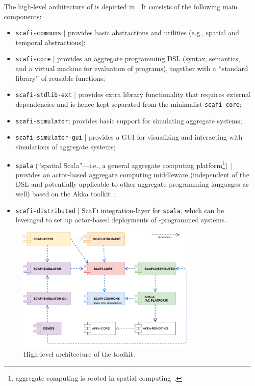 The high-level architecture of \scafi{} is depicted in .
It consists of the following main components: %
\begin{itemize}
\item \texttt{scafi-commons} | provides basic abstractions and utilities (e.g., spatial and temporal abstractions);
\item \texttt{scafi-core} | provides an aggregate programming DSL (syntax, semantics, and a virtual machine for evaluation of programs), together with a ``standard library'' of reusable functions;
\item \texttt{scafi-stdlib-ext} | provides extra library functionality that requires external dependencies and is hence kept separated from the minimalist \texttt{scafi-core};
\item \texttt{scafi-simulator}: provides basic support for simulating aggregate systems;
\item \texttt{scafi-simulator-gui} | provides a GUI for visualizing and interacting with simulations of aggregate systems;
\item \texttt{spala} (``spatial Scala''---i.e., a general aggregate computing platform\footnote{aggregate computing is rooted in spatial computing~\cite{DBLP:journals/corr/abs-1202-5509}.}) | provides an actor-based aggregate computing middleware
(independent of the \scafi{} DSL and potentially applicable to other aggregate programming languages as well)
based on the Akka toolkit~\cite{akka};
\item \texttt{scafi-distributed} | ScaFi integration-layer for \texttt{spala},
which can be leveraged to set up actor-based deployments of \scafi{}-programmed systems.
\end{itemize}

\begin{figure}
\centering
\includegraphics[width=0.8\textwidth]{papers/softwarex2021/imgs/scafi-project-org.pdf}
\caption{High-level architecture of the \scafi{} toolkit.}
\label{fig:scafi-arch}
\end{figure}

